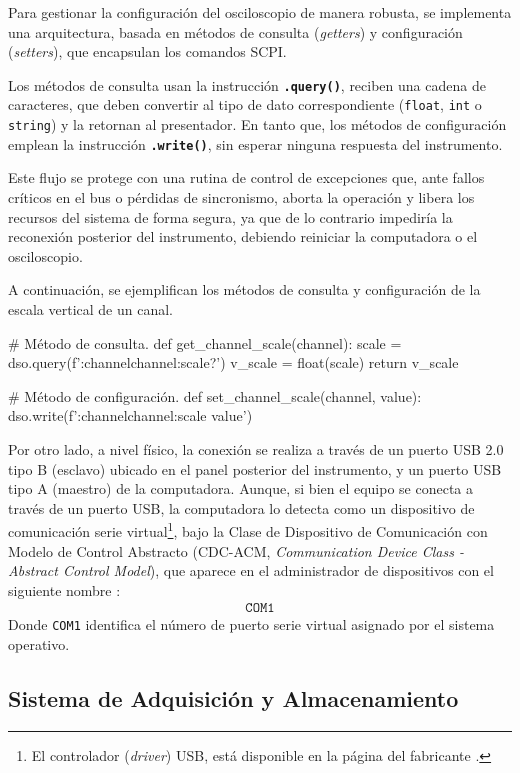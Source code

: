 Para gestionar la configuración del osciloscopio de manera robusta, se implementa una arquitectura, basada en métodos de consulta (\emph{getters}) y configuración (\emph{setters}), que encapsulan los comandos SCPI.

Los métodos de consulta usan la instrucción \textbf{\texttt{.query()}}, reciben una cadena de caracteres, que deben convertir al tipo de dato correspondiente (\texttt{float}, \texttt{int} o \texttt{string}) y la retornan al presentador. En tanto que, los métodos de configuración emplean la instrucción \textbf{\texttt{.write()}}, sin esperar ninguna respuesta del instrumento.

Este flujo se protege con una rutina de control de excepciones que, ante fallos críticos en el bus o pérdidas de sincronismo, aborta la operación y libera los recursos del sistema de forma segura, ya que de lo contrario impediría la reconexión posterior del instrumento, debiendo reiniciar la computadora o el osciloscopio.

A continuación, se ejemplifican los métodos de consulta y configuración de la escala vertical de un canal.
\begin{python}
# Método de consulta.
def get_channel_scale(channel):
    scale = dso.query(f':channel{channel}:scale?')
    v_scale = float(scale)
    return v_scale

# Método de configuración.
def set_channel_scale(channel, value):
    dso.write(f':channel{channel}:scale {value}')
\end{python}

Por otro lado, a nivel físico, la conexión se realiza a través de un puerto USB 2.0 tipo B (esclavo) ubicado en el panel posterior del instrumento, y un puerto USB tipo A (maestro) de la computadora. Aunque, si bien el equipo se conecta a través de un puerto USB, la computadora lo detecta como un dispositivo de comunicación serie virtual\footnote{El controlador (\emph{driver}) USB, está disponible en la página del fabricante \cite{gds1000au_driver}.}, bajo la Clase de Dispositivo de Comunicación con Modelo de Control Abstracto (CDC-ACM, \emph{Communication Device Class - Abstract Control Model}), que aparece en el administrador de dispositivos con el siguiente nombre \cite{gds1000au_ProgrammingManual}:
\begin{align*}
    \texttt{COM1}
\end{align*}
Donde \texttt{COM1} identifica el número de puerto serie virtual asignado por el sistema operativo.

\subsection{Sistema de Adquisición y Almacenamiento}
\label{subsec:arquitectura_flujo}

